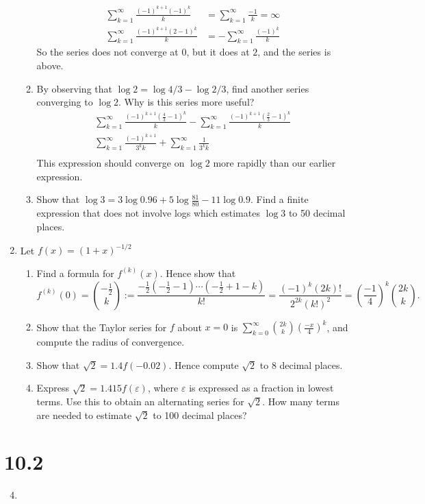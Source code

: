 \documentclass[letterpaper]{article}
\begin{document}
\begin{enumerate}
\begin{enumerate}
  \begin{align*}
    \sum\limits_{k=1}^\infty{\frac{(-1)^{k+1}(-1)^k}{k}}
    &=\sum\limits_{k=1}^\infty{\frac{-1}{k}}=\infty\\
    \sum\limits_{k=1}^\infty{\frac{(-1)^{k+1}(2-1)^k}{k}}
    &=-\sum\limits_{k=1}^\infty{\frac{(-1)^k}{k}}
  \end{align*}
  So the series does not converge at $0$, but it does at $2$, and the series is above.
  \item
  By observing that $\log 2=\log 4/3-\log 2/3$, find another series converging to $\log 2$. Why is this series more useful?
  \begin{align*}
    \sum\limits_{k=1}^\infty{\frac{(-1)^{k+1}(\frac{4}{3}-1)^k}{k}}
    -\sum\limits_{k=1}^\infty{\frac{(-1)^{k+1}(\frac{2}{3}-1)^k}{k}}\\
    \sum\limits_{k=1}^\infty{\frac{(-1)^{k+1}}{3^kk}}
    +\sum\limits_{k=1}^\infty{\frac{1}{3^kk}}\\
  \end{align*}
  This expression should converge on $\log 2$ more rapidly than our earlier expression.
  \item
  Show that $\log 3=3\log0.96+5\log \frac{81}{80}-11\log0.9$. Find a finite expression that does not involve logs which estimates $\log3$ to 50 decimal places.
  \end{enumerate}
\setcounter{enumi}{8}
\item
Let $f(x)=(1+x)^{-1/2}$
  \begin{enumerate}
  \item
  Find a formula for $f^{(k)}(x)$. Hence show that
  \[f^{(k)}(0)={-\frac{1}{2} \choose k}:=\frac{-\frac{1}{2}(-\frac{1}{2}-1)\cdots(-\frac{1}{2}+1-k)}{k!}=\frac{(-1)^k(2k)!}{2^{2k}(k!)^2}=\left(\frac{-1}{4}\right)^k{2k\choose k}.\]
  \item
  Show that the Taylor series for $f$ about $x=0$ is $\sum\limits_{k=0}^\infty{{2k\choose k}\left(\frac{-x}{4}\right)^k}$, and compute the radius of convergence.
  \item
  Show that $\sqrt{2}=1.4f(-0.02)$.
  Hence compute $\sqrt{2}$ to $8$ decimal places.
  \item
  Express $\sqrt{2}=1.415f(\varepsilon)$, where $\varepsilon$ is expressed as a fraction in lowest terms. Use this to obtain an alternating series for $\sqrt{2}$. How many terms are needed to estimate $\sqrt{2}$ to 100 decimal places?
  \end{enumerate}
\end{enumerate}
\section*{10.2}
\begin{enumerate}
\setcounter{enumi}{3}
\item
\end{enumerate}
\end{document}
